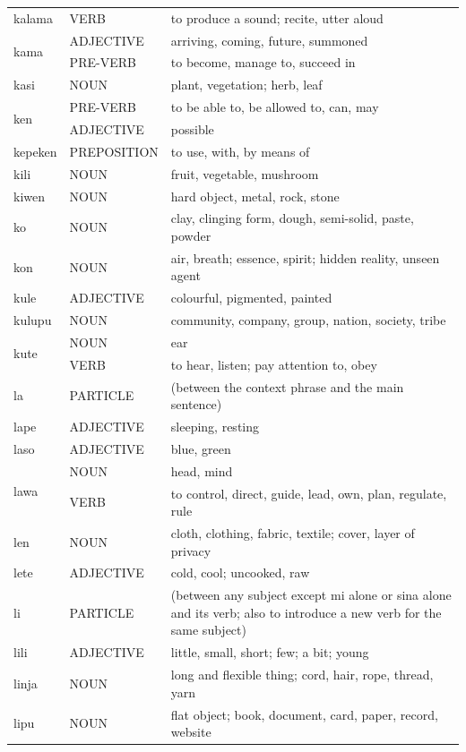 \documentclass[14pt, a4paper]{extreport}
\begin{document}
\begin{longtable}{llp{10cm}}
  kalama & VERB & to produce a sound; recite, utter aloud \\
  \multirow[t]{2}{*}{kama} & ADJECTIVE & arriving, coming, future, summoned \\
  & PRE-VERB & to become, manage to, succeed in \\
  kasi & NOUN & plant, vegetation; herb, leaf \\
  \multirow[t]{2}{*}{ken} & PRE-VERB & to be able to, be allowed to, can, may \\
  & ADJECTIVE & possible \\
  kepeken & PREPOSITION & to use, with, by means of \\
  kili & NOUN & fruit, vegetable, mushroom \\
  kiwen & NOUN & hard object, metal, rock, stone \\
  ko & NOUN & clay, clinging form, dough, semi-solid, paste, powder \\
  kon & NOUN & air, breath; essence, spirit; hidden reality, unseen agent \\
  kule & ADJECTIVE & colourful, pigmented, painted \\
  kulupu & NOUN & community, company, group, nation, society, tribe \\
  \multirow[t]{2}{*}{kute} & NOUN & ear \\
  & VERB & to hear, listen; pay attention to, obey \\
  la & PARTICLE & (between the context phrase and the main sentence) \\
  lape & ADJECTIVE & sleeping, resting \\
  laso & ADJECTIVE & blue, green \\
  \multirow[t]{2}{*}{lawa} & NOUN & head, mind \\
  & VERB & to control, direct, guide, lead, own, plan, regulate, rule \\
  len & NOUN & cloth, clothing, fabric, textile; cover, layer of privacy \\
  lete & ADJECTIVE & cold, cool; uncooked, raw \\
  li & PARTICLE & (between any subject except mi alone or sina alone and its verb; also to introduce a new verb for the same subject) \\
  lili & ADJECTIVE & little, small, short; few; a bit; young \\
  linja & NOUN & long and flexible thing; cord, hair, rope, thread, yarn \\
  lipu & NOUN & flat object; book, document, card, paper, record, website \\

\end{longtable}
\end{document}

